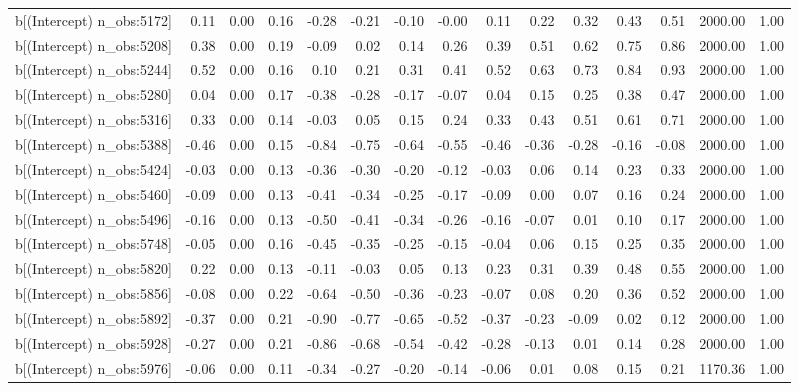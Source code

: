 \begin{table}[ht]
\begin{tabular}{rrrrrrrrrrrrrrr}
  b[(Intercept) n\_obs:5172] & 0.11 & 0.00 & 0.16 & -0.28 & -0.21 & -0.10 & -0.00 & 0.11 & 0.22 & 0.32 & 0.43 & 0.51 & 2000.00 & 1.00 \\ 
  b[(Intercept) n\_obs:5208] & 0.38 & 0.00 & 0.19 & -0.09 & 0.02 & 0.14 & 0.26 & 0.39 & 0.51 & 0.62 & 0.75 & 0.86 & 2000.00 & 1.00 \\ 
  b[(Intercept) n\_obs:5244] & 0.52 & 0.00 & 0.16 & 0.10 & 0.21 & 0.31 & 0.41 & 0.52 & 0.63 & 0.73 & 0.84 & 0.93 & 2000.00 & 1.00 \\ 
  b[(Intercept) n\_obs:5280] & 0.04 & 0.00 & 0.17 & -0.38 & -0.28 & -0.17 & -0.07 & 0.04 & 0.15 & 0.25 & 0.38 & 0.47 & 2000.00 & 1.00 \\ 
  b[(Intercept) n\_obs:5316] & 0.33 & 0.00 & 0.14 & -0.03 & 0.05 & 0.15 & 0.24 & 0.33 & 0.43 & 0.51 & 0.61 & 0.71 & 2000.00 & 1.00 \\ 
  b[(Intercept) n\_obs:5388] & -0.46 & 0.00 & 0.15 & -0.84 & -0.75 & -0.64 & -0.55 & -0.46 & -0.36 & -0.28 & -0.16 & -0.08 & 2000.00 & 1.00 \\ 
  b[(Intercept) n\_obs:5424] & -0.03 & 0.00 & 0.13 & -0.36 & -0.30 & -0.20 & -0.12 & -0.03 & 0.06 & 0.14 & 0.23 & 0.33 & 2000.00 & 1.00 \\ 
  b[(Intercept) n\_obs:5460] & -0.09 & 0.00 & 0.13 & -0.41 & -0.34 & -0.25 & -0.17 & -0.09 & 0.00 & 0.07 & 0.16 & 0.24 & 2000.00 & 1.00 \\ 
  b[(Intercept) n\_obs:5496] & -0.16 & 0.00 & 0.13 & -0.50 & -0.41 & -0.34 & -0.26 & -0.16 & -0.07 & 0.01 & 0.10 & 0.17 & 2000.00 & 1.00 \\ 
  b[(Intercept) n\_obs:5748] & -0.05 & 0.00 & 0.16 & -0.45 & -0.35 & -0.25 & -0.15 & -0.04 & 0.06 & 0.15 & 0.25 & 0.35 & 2000.00 & 1.00 \\ 
  b[(Intercept) n\_obs:5820] & 0.22 & 0.00 & 0.13 & -0.11 & -0.03 & 0.05 & 0.13 & 0.23 & 0.31 & 0.39 & 0.48 & 0.55 & 2000.00 & 1.00 \\ 
  b[(Intercept) n\_obs:5856] & -0.08 & 0.00 & 0.22 & -0.64 & -0.50 & -0.36 & -0.23 & -0.07 & 0.08 & 0.20 & 0.36 & 0.52 & 2000.00 & 1.00 \\ 
  b[(Intercept) n\_obs:5892] & -0.37 & 0.00 & 0.21 & -0.90 & -0.77 & -0.65 & -0.52 & -0.37 & -0.23 & -0.09 & 0.02 & 0.12 & 2000.00 & 1.00 \\ 
  b[(Intercept) n\_obs:5928] & -0.27 & 0.00 & 0.21 & -0.86 & -0.68 & -0.54 & -0.42 & -0.28 & -0.13 & 0.01 & 0.14 & 0.28 & 2000.00 & 1.00 \\ 
  b[(Intercept) n\_obs:5976] & -0.06 & 0.00 & 0.11 & -0.34 & -0.27 & -0.20 & -0.14 & -0.06 & 0.01 & 0.08 & 0.15 & 0.21 & 1170.36 & 1.00 \\ 

\end{tabular}
\end{table}
